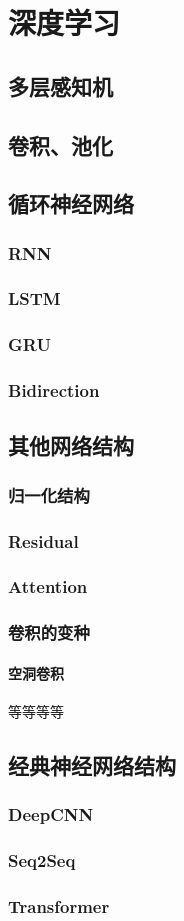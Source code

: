 \chapter{深度学习}
    \section{多层感知机}
    \section{卷积、池化}
    \section{循环神经网络}
    \subsection{RNN}
    \subsection{LSTM}
    \subsection{GRU}
    \subsection{Bidirection}
    \section{其他网络结构}
    \subsection{归一化结构}
    \subsection{Residual}
    \subsection{Attention}
    \subsection{卷积的变种}
    \subsubsection{空洞卷积}
    等等等等
    \section{经典神经网络结构}
    \subsection{DeepCNN}
    \subsection{Seq2Seq}
    \subsection{Transformer}